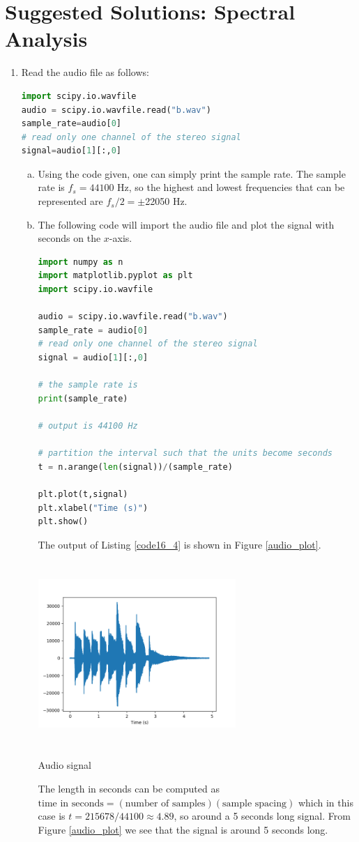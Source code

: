 \newpage
\section{Suggested Solutions: Spectral Analysis}

\begin{enumerate}
\item Read the audio file as follows:
\begin{lstlisting}[language=Python]
import scipy.io.wavfile
audio = scipy.io.wavfile.read("b.wav")
sample_rate=audio[0]
# read only one channel of the stereo signal
signal=audio[1][:,0]
\end{lstlisting}

\begin{enumerate}[a)]
\item Using the code given, one can simply print the sample rate. The sample rate is $f_s=44100$ Hz, so the highest and lowest frequencies that can be represented are $f_{s}/2=\pm$22050 Hz.

\item The following code will import the audio file and plot the signal with seconds on the $x$-axis. 
\begin{lstlisting}[language=Python, caption=Code to plot audio signal,label=code16_4]
import numpy as n
import matplotlib.pyplot as plt
import scipy.io.wavfile

audio = scipy.io.wavfile.read("b.wav")
sample_rate = audio[0]
# read only one channel of the stereo signal
signal = audio[1][:,0]

# the sample rate is
print(sample_rate)

# output is 44100 Hz

# partition the interval such that the units become seconds
t = n.arange(len(signal))/(sample_rate)

plt.plot(t,signal)
plt.xlabel("Time (s)")
plt.show()
\end{lstlisting}
The output of Listing \ref{code16_4} is shown in Figure \ref{audio_plot}.
\begin{marginfigure}
    \centering
    \includegraphics[width=7.5cm,height=7.0cm]{ch17/figures/audio.png}
    \caption{Audio signal}
    \label{audio_plot}
\end{marginfigure}
The length in seconds can be computed as $\text{time in seconds}=(\text{number of samples})(\text{sample spacing})$ which in this case is $t=215678/44100\approx 4.89$, so around a 5 seconds long signal. From Figure \ref{audio_plot} we see that the signal is around 5 seconds long. 


\end{enumerate}
\end{enumerate}

